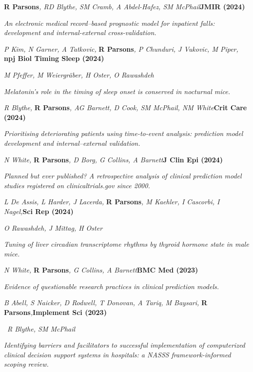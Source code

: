 \item
    \textbf{R Parsons}\textit{, RD Blythe, SM Cramb, A Abdel-Hafez, SM McPhail}\textbf{\hfill{JMIR (2024)}}\par
    \textit{An electronic medical record–based prognostic model for inpatient falls: development and internal-external cross-validation.}
\item
    \textit{P Kim, N Garner, A Tatkovic, }\textbf{R Parsons}\textit{, P Chunduri, J Vukovic, M Piper, }\textbf{\hfill{npj Biol Timing Sleep (2024)}}\par
	\textit{M Pfeffer, M Weiergr{\"a}ber, H Oster, O Rawashdeh}\par
    \textit{Melatonin’s role in the timing of sleep onset is conserved in nocturnal mice.}
\item
    \textit{R Blythe, }\textbf{R Parsons}\textit{, AG Barnett, D Cook, SM McPhail, NM White}\textbf{\hfill{Crit Care (2024)}}\par
    \textit{Prioritising deteriorating patients using time-to-event analysis: prediction model development and internal–external validation.}
\item
    \textit{N White, }\textbf{R Parsons}\textit{, D Borg, G Collins, A Barnett}\textbf{\hfill{J Clin Epi (2024)}}\par
    \textit{Planned but ever published? A retrospective analysis of clinical prediction model studies registered on clinicaltrials.gov since 2000.}
\item
	\textit{L De Assis, L Harder, J Lacerda, }\textbf{R Parsons}\textit{, M Kaehler, I Cascorbi, I Nagel,}\textbf{\hfill{Sci Rep (2024)}}\par
	\textit{O Rawashdeh, J Mittag, H Oster}\par
    \textit{Tuning of liver circadian transcriptome rhythms by thyroid hormone state in male mice.}
\item
    \textit{N White, }\textbf{R Parsons}\textit{, G Collins, A Barnett}\textbf{\hfill{BMC Med (2023)}}\par
    \textit{Evidence of questionable research practices in clinical prediction models.}
\item
    \textit{B Abell, S Naicker, D Rodwell, T Donovan, A Tariq, M Baysari, }\textbf{R Parsons}\textit{,}\textbf{\hfill{Implement Sci (2023)}}\par\
	\textit{R Blythe, SM McPhail}\par
    \textit{Identifying barriers and facilitators to successful implementation of computerized clinical decision support systems in hospitals: a NASSS framework-informed scoping review.}
